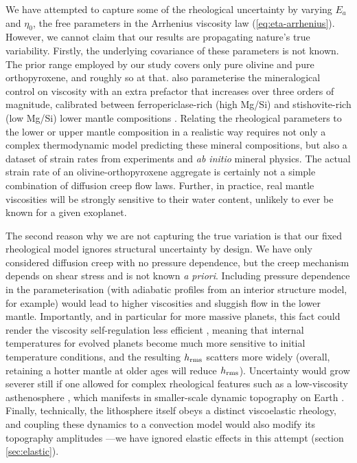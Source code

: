 \documentclass[trackchanges]{aastex63}
\begin{document}
We have attempted to capture some of the rheological uncertainty by varying $E_a$ and $\eta_0$, the free parameters in the Arrhenius viscosity law (\ref{eq:eta-arrhenius}). However, we cannot claim that our results are propagating nature's true variability. Firstly, the underlying covariance of these parameters is not known. The prior range employed by our study covers only pure olivine and pure orthopyroxene, and roughly so at that. \citet{spaargaren_influence_2020} also parameterise the mineralogical control on viscosity with an extra prefactor that increases over three orders of magnitude, calibrated between ferropericlase-rich (high Mg/Si) and stishovite-rich (low Mg/Si) lower mantle compositions \citep{xu_silicon_2017, ballmer_persistence_2017}. Relating the rheological parameters to the lower or upper mantle composition in a realistic way requires not only a complex thermodynamic model predicting these mineral compositions, but also a dataset of strain rates from experiments and \textit{ab initio} mineral physics. The actual strain rate of an olivine-orthopyroxene aggregate is certainly not a simple combination of diffusion creep flow laws. Further, in practice, real mantle viscosities will be strongly sensitive to their water content, unlikely to ever be known for a given exoplanet.

The second reason why we are not capturing the true variation is that our fixed rheological model ignores structural uncertainty by design. We have only considered diffusion creep with no pressure dependence, but the creep mechanism depends on shear stress and is not known \textit{a priori}. Including pressure dependence in the parameterisation (with adiabatic profiles from an interior structure model, for example) would lead to higher viscosities and sluggish flow in the lower mantle. Importantly, and in particular for more massive planets, this fact could render the viscosity self-regulation less efficient \citep{stamenkovic_influence_2012}, meaning that internal temperatures for evolved planets become much more sensitive to initial temperature conditions, and the resulting $h_{\rm rms}$ scatters more widely (overall, retaining a hotter mantle at older ages will reduce $h_{\rm rms}$). Uncertainty would grow severer still if one allowed for complex rheological features such as a low-viscosity asthenosphere \citep{bodur_impact_2019}, which manifests in smaller-scale dynamic topography on Earth \citep{hoggard_global_2016}. Finally, technically, the lithosphere itself obeys a distinct viscoelastic rheology, and coupling these dynamics to a convection model would also modify its topography amplitudes \citep{patocka_stress_2017}---we have ignored elastic effects in this attempt (section \ref{sec:elastic}).
\end{document}
